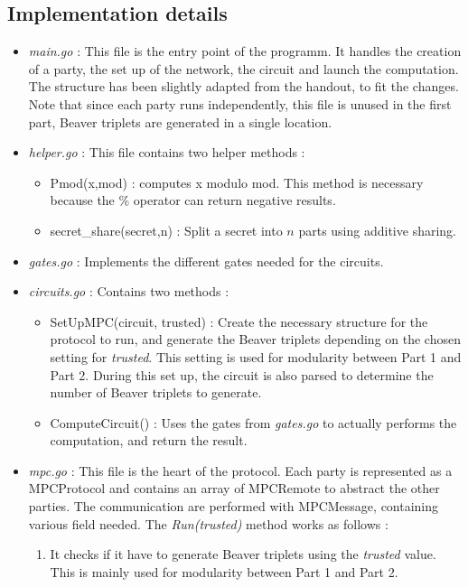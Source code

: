\documentclass[10pt,conference]{IEEEtran}
\begin{document}
\subsection{Implementation details}
\begin{itemize}
    \item \textit{main.go} : This file is the entry point of the programm. It handles the creation of a party, the set up of the network, the circuit and launch the computation. The structure has been slightly adapted from the handout, to fit the changes. Note that since each party runs independently, this file is unused in the first part, Beaver triplets are generated in a single location.
    \item \textit{helper.go} : This file contains two helper methods :
        \begin{itemize}
            \item Pmod(x,mod) : computes x modulo mod. This method is necessary because the \% operator can return negative results.
            \item secret\_share(secret,n) : Split a secret into $n$ parts using additive sharing.
        \end{itemize}
    \item \textit{gates.go} : Implements the different gates needed for the circuits.
    \item \textit{circuits.go} : Contains two methods :
        \begin{itemize}
            \item SetUpMPC(circuit, trusted) : Create the necessary structure for the protocol to run, and generate the Beaver triplets depending on the chosen setting for \textit{trusted}. This setting is used for modularity between Part 1 and Part 2. During this set up, the circuit is also parsed to determine the number of Beaver triplets to generate.
            \item ComputeCircuit() : Uses the gates from \textit{gates.go} to actually performs the computation, and return the result.
        \end{itemize}
    \item \textit{mpc.go} : This file is the heart of the protocol. Each party is represented as a MPCProtocol and contains an array of MPCRemote to abstract the other parties. The communication are performed with MPCMessage, containing various field needed. The \textit{Run(trusted)} method works as follows :
        \begin{enumerate}
            \item It checks if it have to generate Beaver triplets using the \textit{trusted} value. This is mainly used for modularity between Part 1 and Part 2.

\end{enumerate}
\end{itemize}
\end{document}
